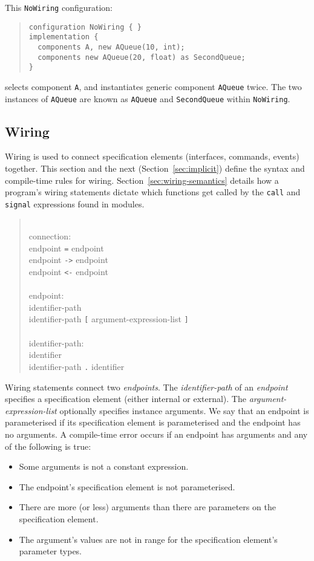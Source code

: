 \documentclass[11pt,letterpaper]{article}
\newcommand{\kw}[1]{{\tt #1}}
\newcommand{\code}[1]{{\tt #1}}
\newcommand{\grammarshift}{\vspace*{-.7cm}}
\newcommand{\grammarindent}{\hspace*{2cm}\= \\ \kill}
\begin{document}
This \code{NoWiring} configuration:
\begin{quote}
\begin{verbatim}
configuration NoWiring { }
implementation {
  components A, new AQueue(10, int);
  components new AQueue(20, float) as SecondQueue;
}
\end{verbatim}
\end{quote}
selects component \code{A}, and instantiates generic component
\code{AQueue} twice. The two instances of \code{AQueue} are known as
\code{AQueue} and \code{SecondQueue} within \code{NoWiring}.

\subsection{Wiring}
\label{sec:wiring}

Wiring is used to connect specification elements (interfaces, commands,
events) together. This section and the next (Section~\ref{sec:implicit})
define the syntax and compile-time rules for
wiring. Section~\ref{sec:wiring-semantics} details how a program's wiring
statements dictate which functions get called by the \kw{call} and
\kw{signal} expressions found in modules. 
\begin{quote} \grammarshift \em \begin{tabbing}
\grammarindent
connection:\\
\>	endpoint \kw{=} endpoint\\
\>	endpoint \kw{->} endpoint\\
\>	endpoint \kw{<-} endpoint\\
\\
endpoint:\\
\>	identifier-path \\
\>	identifier-path \kw{[} argument-expression-list \kw{]}\\
\\
identifier-path:\\
\>	identifier\\
\>	identifier-path \kw{.} identifier\\
\end{tabbing} \end{quote}


Wiring statements connect two \emph{endpoints}. The
\emph{identifier-path} of an \emph{endpoint} specifies a specification
element (either internal or external). The
\emph{argument-expression-list} optionally specifies instance
arguments. We say that an endpoint is parameterised if its
specification element is parameterised and the endpoint has no
arguments. A compile-time error occurs if an endpoint has
arguments and any of the following is true:
\begin{itemize}
\item Some arguments is not a constant expression.
\item The endpoint's specification element is not parameterised.
\item There are more (or less) arguments than there are parameters
on the specification element.
\item The argument's values are not in range for the specification element's
parameter types.
\end{itemize}
\end{document}
